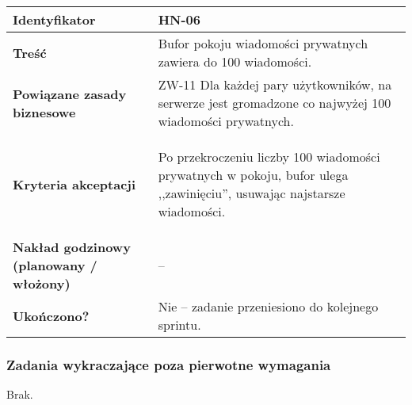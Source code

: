 \begin{tabular}{ | l | l | }
	\hline
		\textbf{Identyfikator} &
		HN-06
		\\

	\hline
		\textbf{Treść} & \parbox[t]{11.5cm}{\strut
			Bufor pokoju wiadomości prywatnych zawiera do 100 wiadomości.
		\strut}\\

	\hline
		\parbox[t]{4cm}{\textbf{Powiązane zasady biznesowe}} & \parbox[t]{11.5cm}{\strut
			ZW-11 Dla każdej pary użytkowników, na serwerze jest gromadzone co najwyżej 100 wiadomości prywatnych.
		\strut}\\

	\hline
		\parbox[t]{4cm}{\textbf{Kryteria akceptacji}} & \parbox[t]{11.5cm}{\strut
			\begin{enumreq}
				\item Po przekroczeniu liczby 100 wiadomości prywatnych w pokoju, bufor
        ulega ,,zawinięciu'', usuwając najstarsze wiadomości.
			\end{enumreq}
			\strut}
		\\

	\hline
  \parbox[t]{4cm}{\textbf{Nakład godzinowy (planowany / włożony)}} &
  \parbox[t]{11.5cm}{\strut
    --
  \strut}\\

  \hline
    \parbox[t]{4cm}{\textbf{Ukończono?}} &
    \parbox[t]{11.5cm}{\strut
      Nie -- zadanie przeniesiono do kolejnego sprintu.
    \strut}\\
\hline
\end{tabular}

\subsubsection{Zadania wykraczające poza pierwotne wymagania}

Brak.
